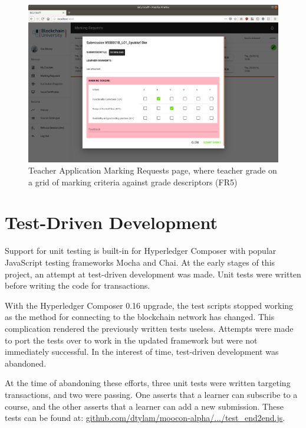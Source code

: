 \begin{figure}[!ht]
	\centering
	\includegraphics[width=1.05\textwidth]{Teacher_marking}
	\caption[Teacher Application Marking Requests page]
	{Teacher Application Marking Requests page, 
	where teacher grade on a grid of marking criteria against grade descriptors (FR5)}
	\label{fig:Teacher_marking}
\end{figure}

\clearpage
\section{Test-Driven Development}

Support for unit testing is built-in for Hyperledger Composer with popular JavaScript testing frameworks Mocha and Chai.
At the early stages of this project, an attempt at test-driven development was made. 
Unit tests were written before writing the code for transactions.

With the Hyperledger Composer 0.16 upgrade, the test scripts stopped working as 
the method for connecting to the blockchain network has changed. This complication 
rendered the previously written tests useless. Attempts were made to port the tests over 
to work in the updated framework but were not immediately successful. In the interest of 
time, test-driven development was abandoned.

At the time of abandoning these efforts, three unit tests were written targeting transactions, 
and two were passing. One asserts that a learner can subscribe to a course, 
and the other asserts that a learner can add a new submission. 
These tests can be found at: \href{https://github.com/dtylam/moocon-alpha/blob/master/test/test_end2end.js}
{\underline{github.com/dtylam/moocon-alpha/.../test\_end2end.js}}.

